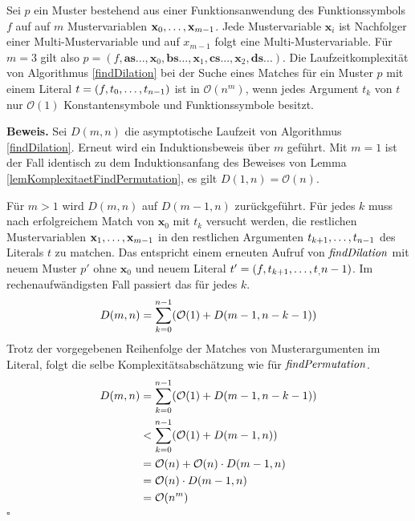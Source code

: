 \begin{lemma}\label{lemKomplexitaetDilation}
Sei $p$ ein Muster bestehend aus einer Funktionsanwendung des Funktionssymbols $f$ auf auf $m$ Mustervariablen ${\mathbf x}_{0}, \dots, {\mathbf x}_{m-1}$. 
Jede Mustervariable $\mathbf x_i$ ist Nachfolger einer Multi-Mustervariable und auf $x_{m-1}$ folgt eine Multi-Mustervariable. Für $m = 3$ gilt also $p = (f, \mathbf{as...}, \mathbf x_0, \mathbf{bs...}, \mathbf x_1, \mathbf{cs...}, \mathbf x_2, \mathbf{ds...})$.
Die Laufzeitkomplexität von Algorithmus \ref{findDilation} bei der Suche eines Matches für ein Muster $p$  mit einem Literal $t = (f, {t}_{0}, \dots, {t}_{n-1})$ ist in $\mathcal O(n^m)$, wenn jedes Argument $t_k$ von $t$ nur $\mathcal O(1)$ Konstantensymbole und Funktionssymbole besitzt.
\end{lemma}

\textbf{Beweis.}
Sei $D(m, n)$ die asymptotische Laufzeit von Algorithmus \ref{findDilation}. Erneut wird ein Induktionsbeweis über $m$ geführt.
Mit $m = 1$ ist der Fall identisch zu dem Induktionsanfang des Beweises von Lemma \ref{lemKomplexitaetFindPermutation}, es gilt $D(1, n) = \mathcal O(n)$. 

Für $m > 1$ wird $D(m, n)$ auf $D(m-1, n)$ zurückgeführt. Für jedes $k$ muss nach erfolgreichem Match von $\mathbf x_0$ mit $t_k$ versucht werden, die restlichen Mustervariablen ${\mathbf x}_{1}, \dots, {\mathbf x}_{m-1}$ in den restlichen Argumenten ${t}_{k+1}, \dots, {t}_{n-1}$ des Literals $t$ zu matchen. Das entspricht einem erneuten Aufruf von $\mathit{findDilation}$ mit neuem Muster $p'$ ohne $\mathbf x_0$ und neuem Literal $t' = (f, {t}_{k+1}, \dots, {t}_{,} {n-1})$.
Im rechenaufwändigsten Fall passiert das für jedes $k$.
$$D(m, n) = \sum_{k = 0}^{n-1} \paren*{\mathcal O(1) + D(m-1, n - k - 1)}$$
Trotz der vorgegebenen Reihenfolge der Matches von Musterargumenten im Literal, folgt die selbe Komplexitätsabschätzung wie für $\mathit{findPermutation}$.
\begin{equation*}
	\begin{split} 
		D(m, n) 
		&= \sum_{k = 0}^{n-1} \paren*{\mathcal O(1) + D(m-1, n - k - 1)}\\ 
		&< \sum_{k = 0}^{n-1} \paren*{\mathcal O(1) + D(m-1, n)}\\
		&= \mathcal O(n) + \mathcal O(n) \cdot D(m-1, n)\\
		&= \mathcal O(n) \cdot D(m-1, n)\\
		&= \mathcal O(n^m)
	\end{split}
\end{equation*}
\hfill $\square$\\


